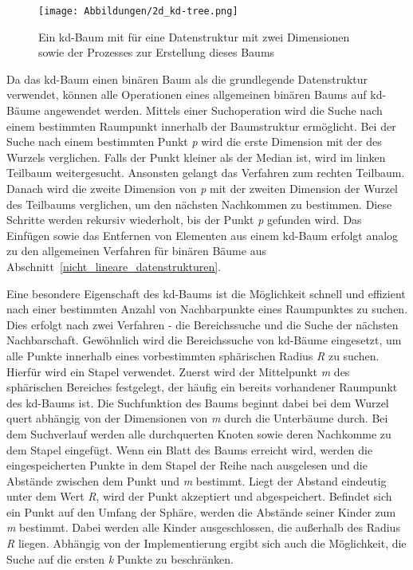 
\begin{figure}[!b]
	\texttt{[image: Abbildungen/2d\_kd-tree.png]}
	\centering
	\caption[kd-Baum einer zweidimensionaler Datenstruktur]{Ein kd-Baum mit für eine Datenstruktur mit zwei Dimensionen sowie der Prozesses zur Erstellung dieses Baums \autocite[60]{garcia-garcia_alberto_towards_2015}}
	\label{fig: kd-tree_creation}
\end{figure}

Da das kd-Baum einen binären Baum als die grundlegende Datenstruktur verwendet, können alle Operationen eines allgemeinen binären Baums auf kd-Bäume angewendet werden. Mittels einer Suchoperation wird die Suche nach einem bestimmten Raumpunkt innerhalb der Baumstruktur ermöglicht. Bei der Suche nach einem bestimmten Punkt \textit{p} wird die erste Dimension mit der des Wurzels verglichen. Falls der Punkt kleiner als der Median ist, wird im linken Teilbaum weitergesucht. Ansonsten gelangt das Verfahren zum rechten Teilbaum. Danach wird die zweite Dimension von \textit{p} mit der zweiten Dimension der Wurzel des Teilbaums verglichen, um den nächsten Nachkommen zu bestimmen. Diese Schritte werden rekursiv wiederholt, bis der Punkt \textit{p} gefunden wird. Das Einfügen sowie das Entfernen von Elementen aus einem kd-Baum erfolgt analog zu den allgemeinen Verfahren für binären Bäume aus Abschnitt~\ref{nicht_lineare_datenstrukturen}. \autocite[94]{saha_advanced_2019}

Eine besondere Eigenschaft des kd-Baums ist die Möglichkeit schnell und effizient nach einer bestimmten Anzahl von Nachbarpunkte eines Raumpunktes zu suchen. Dies erfolgt nach zwei Verfahren - die Bereichssuche und die Suche der nächsten Nachbarschaft. Gewöhnlich wird die Bereichssuche von kd-Bäume eingesetzt, um alle Punkte innerhalb eines vorbestimmten sphärischen Radius \textit{R} zu suchen. Hierfür wird ein Stapel verwendet. Zuerst wird der Mittelpunkt \textit{m} des sphärischen Bereiches festgelegt, der häufig ein bereits vorhandener Raumpunkt des kd-Baums ist. Die Suchfunktion des Baums beginnt dabei bei dem Wurzel quert abhängig von der Dimensionen von \textit{m} durch die Unterbäume durch. Bei dem Suchverlauf werden alle durchquerten Knoten sowie deren Nachkomme zu dem Stapel eingefügt. Wenn ein Blatt des Baums erreicht wird, werden die eingespeicherten Punkte in dem Stapel der Reihe nach ausgelesen und die Abstände zwischen dem Punkt und \textit{m} bestimmt. Liegt der Abstand eindeutig unter dem Wert \textit{R}, wird der Punkt akzeptiert und abgespeichert. Befindet sich ein Punkt auf den Umfang der Sphäre, werden die Abstände seiner Kinder zum \textit{m} bestimmt. Dabei werden alle Kinder ausgeschlossen, die außerhalb des Radius \textit{R} liegen. Abhängig von der Implementierung ergibt sich auch die Möglichkeit, die Suche auf die ersten \textit{k} Punkte zu beschränken. \autocite[95]{saha_advanced_2019}

